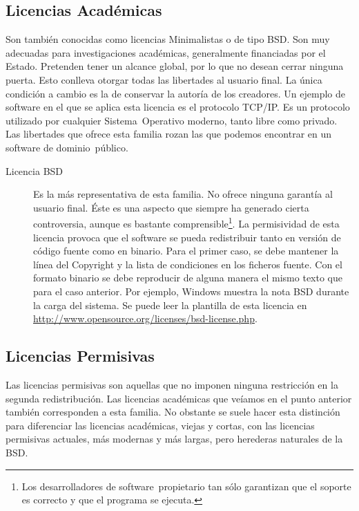 \subsection{Licencias Académicas}
Son también conocidas como licencias Minimalistas o de tipo BSD. Son
muy adecuadas para investigaciones académicas, generalmente
financiadas por el Estado. Pretenden tener un alcance global, por lo
que no desean cerrar ninguna puerta. Esto conlleva otorgar todas las
libertades al usuario final. La única condición a cambio es la de
conservar la autoría de los creadores. Un ejemplo de software en el
que se aplica esta licencia es el protocolo TCP/IP. Es un protocolo
utilizado por cualquier Sistema~Operativo moderno, tanto libre como
privado. Las libertades que ofrece esta familia rozan las que podemos
encontrar en un software de dominio~público.
\begin{description}
\item[Licencia BSD] Es la más representativa de esta familia. No
  ofrece ninguna garantía al usuario final. Éste es una aspecto que
  siempre ha generado cierta controversia, aunque es bastante
  comprensible\footnote{Los desarrolladores de software~propietario
    tan sólo garantizan que el soporte es correcto y que el programa
    se ejecuta.}. La permisividad de esta licencia provoca que el
  software se pueda redistribuir tanto en versión de código fuente
  como en binario. Para el primer caso, se debe mantener la línea del
  Copyright y la lista de condiciones en los ficheros fuente. Con el
  formato binario se debe reproducir de alguna manera el mismo texto
  que para el caso anterior. Por ejemplo, Windows muestra la nota BSD
  durante la carga del sistema. Se puede leer la plantilla de esta
  licencia en
  \url{http://www.opensource.org/licenses/bsd-license.php}.
\end{description}

\subsection{Licencias Permisivas}

Las licencias permisivas son aquellas que no imponen ninguna
restricción en la segunda redistribución. Las licencias académicas que
veíamos en el punto anterior también corresponden a esta familia. No
obstante se suele hacer esta distinción para diferenciar las licencias
académicas, viejas y cortas, con las licencias permisivas actuales,
más modernas y más largas, pero herederas naturales de la BSD.

